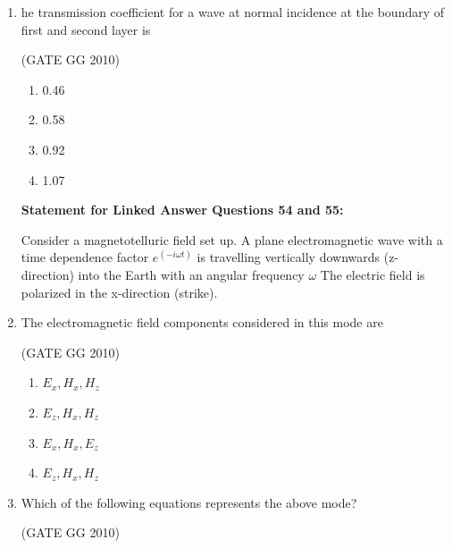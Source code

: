 \documentclass[journal]{IEEEtran}
\begin{document}
\begin{enumerate}[start=26]
\hfill (GATE GG 2010) 
\begin{multicols}{4}

\begin{enumerate}
    \item  $10^3$
\item  $10^4$
\item  $10^5$
\item  $10^7$
\end{enumerate}
\end{multicols}

\item he transmission coefficient for a wave at normal incidence at the boundary of first and second layer is

\hfill (GATE GG 2010) 
\begin{multicols}{4}

\begin{enumerate}
    \item  0.46
\item 0.58
\item 0.92
\item  1.07
\end{enumerate}
\end{multicols}

\textbf{Statement for Linked Answer Questions 54 and 55:}

Consider a magnetotelluric  field set up. A plane electromagnetic wave with a time dependence factor $e^{(-i\omega t)}$ is travelling vertically downwards (z-direction) into the Earth with an angular frequency $\omega$ The electric field is polarized in the x-direction (strike).
\item The electromagnetic field components considered in this mode are

\hfill(GATE GG 2010)
\begin{multicols}{4}
\begin{enumerate}
    \item ${E_x,H_x,H_z}$
    \item ${E_z,H_x,H_z}$
    \item ${E_x,H_x,E_z}$
    \item ${E_z,H_x,H_z}$
\end{enumerate}
\end{multicols}

\item Which of the following equations represents the above mode?

\hfill (GATE GG 2010) 
\begin{multicols}{4}


\end{multicols}
\end{enumerate}
\end{document}

